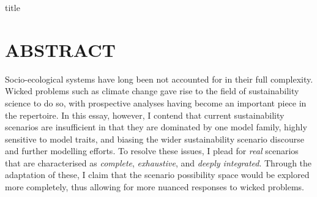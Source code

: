 \documentclass{article}
\begin{document}
{title}

\frontmatter
\tableofcontents

\mainmatter
\linenumbers

{\huge{\multiTitle}}

\section*{ABSTRACT}
Socio-ecological systems have long been not accounted for in their full complexity. Wicked problems such as climate change gave rise to the field of sustainability science to do so, with prospective analyses having become an important piece in the repertoire. In this essay, however, I contend that current sustainability scenarios are insufficient in that they are dominated by one model family, highly sensitive to model traits, and biasing the wider sustainability scenario discourse and further modelling efforts. To resolve these issues, I plead for \textit{real} scenarios that are characterised as \textit{complete}, \textit{exhaustive}, and \textit{deeply integrated}. Through the adaptation of these, I claim that the scenario possibility space would be explored more completely, thus allowing for more nuanced responses to wicked problems.
\end{document}

